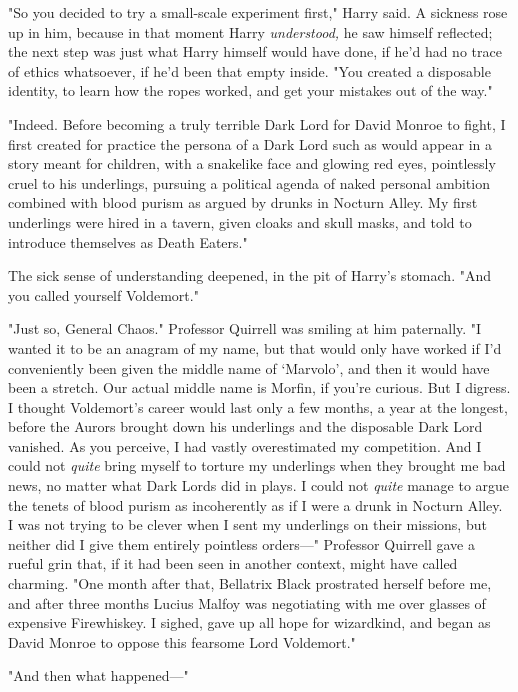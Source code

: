 "So you decided to try a small-scale experiment first," Harry said. A sickness 
rose up in him, because in that moment Harry \emph{understood,} he saw himself 
reflected; the next step was just what Harry himself would have done, if he'd 
had no trace of ethics whatsoever, if he'd been that empty inside. "You created 
a disposable identity, to learn how the ropes worked, and get your mistakes out 
of the way."

"Indeed. Before becoming a truly terrible Dark Lord for David Monroe to fight, 
I first created for practice the persona of a Dark Lord such as would appear in 
a story meant for children, with a snakelike face and glowing red eyes, 
pointlessly cruel to his underlings, pursuing a political agenda of naked 
personal ambition combined with blood purism as argued by drunks in Nocturn 
Alley. My first underlings were hired in a tavern, given cloaks and skull 
masks, and told to introduce themselves as Death Eaters."

The sick sense of understanding deepened, in the pit of Harry's stomach. "And 
you called yourself Voldemort."

"Just so, General Chaos." Professor Quirrell was smiling at him paternally. "I 
wanted it to be an anagram of my name, but that would only have worked if I'd 
conveniently been given the middle name of `Marvolo', and then it would have 
been a stretch. Our actual middle name is Morfin, if you're curious. But I 
digress. I thought Voldemort's career would last only a few months, a year at 
the longest, before the Aurors brought down his underlings and the disposable 
Dark Lord vanished. As you perceive, I had vastly overestimated my competition. 
And I could not \emph{quite} bring myself to torture my underlings when they 
brought me bad news, no matter what Dark Lords did in plays. I could not 
\emph{quite} manage to argue the tenets of blood purism as incoherently as if I 
were a drunk in Nocturn Alley. I was not trying to be clever when I sent my 
underlings on their missions, but neither did I give them entirely pointless 
orders---" Professor Quirrell gave a rueful grin that, if it had been seen in 
another context, might have called charming. "One month after that, Bellatrix 
Black prostrated herself before me, and after three months Lucius Malfoy was 
negotiating with me over glasses of expensive Firewhiskey. I sighed, gave up 
all hope for wizardkind, and began as David Monroe to oppose this fearsome Lord 
Voldemort."

"And then what happened---"

